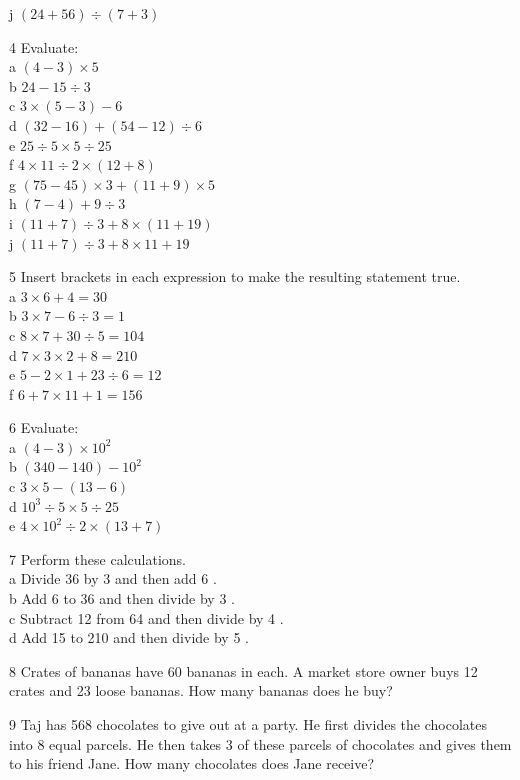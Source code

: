 \documentclass[10pt]{article}
\begin{document}
j \((24+56) \div(7+3)\)

4 Evaluate:\\
a \((4-3) \times 5\)\\
b \(24-15 \div 3\)\\
c \(3 \times(5-3)-6\)\\
d \((32-16)+(54-12) \div 6\)\\
e \(25 \div 5 \times 5 \div 25\)\\
f \(4 \times 11 \div 2 \times(12+8)\)\\
g \((75-45) \times 3+(11+9) \times 5\)\\
h \((7-4)+9 \div 3\)\\
i \((11+7) \div 3+8 \times(11+19)\)\\
j \((11+7) \div 3+8 \times 11+19\)

5 Insert brackets in each expression to make the resulting statement true.\\
a \(3 \times 6+4=30\)\\
b \(3 \times 7-6 \div 3=1\)\\
c \(8 \times 7+30 \div 5=104\)\\
d \(7 \times 3 \times 2+8=210\)\\
e \(5-2 \times 1+23 \div 6=12\)\\
f \(6+7 \times 11+1=156\)

6 Evaluate:\\
a \((4-3) \times 10^{2}\)\\
b \((340-140)-10^{2}\)\\
c \(3 \times 5-(13-6)\)\\
d \(10^{3} \div 5 \times 5 \div 25\)\\
e \(4 \times 10^{2} \div 2 \times(13+7)\)

7 Perform these calculations.\\
a Divide 36 by 3 and then add 6 .\\
b Add 6 to 36 and then divide by 3 .\\
c Subtract 12 from 64 and then divide by 4 .\\
d Add 15 to 210 and then divide by 5 .

8 Crates of bananas have 60 bananas in each. A market store owner buys 12 crates and 23 loose bananas. How many bananas does he buy?

9 Taj has 568 chocolates to give out at a party. He first divides the chocolates into 8 equal parcels. He then takes 3 of these parcels of chocolates and gives them to his friend Jane. How many chocolates does Jane receive?
\end{document}
